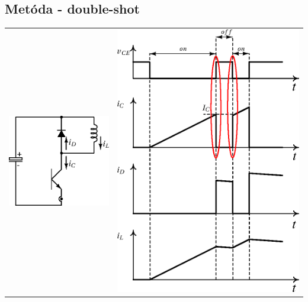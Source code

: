 \documentclass[oneside]{article}
\begin{document}
\subsection{Metóda - double-shot}
{\centering
	\begin{tabular}{p{}  p{} }
	\vspace{-5.5cm} \includegraphics[scale=.8]{obr/tranzistorovy_spinac}
	&
    	\includegraphics[scale=.6]{obr/priebehy_doubleshot} \newline
    \end{tabular}
}
\end{document}
